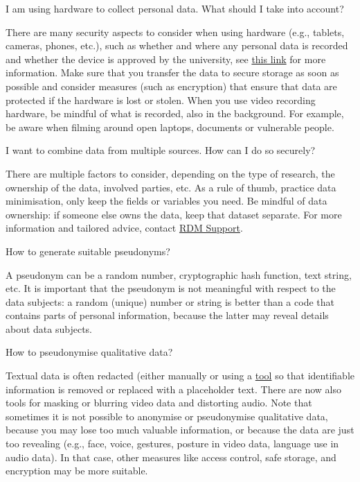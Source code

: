 \documentclass[
]{book}
\begin{document}
I am using hardware to collect personal data. What should I take into account?

There are many security aspects to consider when using hardware (e.g., tablets, cameras, phones, etc.), such as whether and where any personal data is recorded and whether the device is approved by the university, see \href{https://students.uu.nl/en/practical-information/it-facilities/information-security-at-the-uu}{this link} for more information. Make sure that you transfer the data to secure storage as soon as possible and consider measures (such as encryption) that ensure that data are protected if the hardware is lost or stolen. When you use video recording hardware, be mindful of what is recorded, also in the background. For example, be aware when filming around open laptops, documents or vulnerable people.

I want to combine data from multiple sources. How can I do so securely?

There are multiple factors to consider, depending on the type of research, the ownership of the data, involved parties, etc. As a rule of thumb, practice data minimisation, only keep the fields or variables you need. Be mindful of data ownership: if someone else owns the data, keep that dataset separate. For more information and tailored advice, contact \href{https://www.uu.nl/en/research/research-data-management/contact-us}{RDM Support}.

How to generate suitable pseudonyms?

A pseudonym can be a random number, cryptographic hash function, text string, etc. It is important that the pseudonym is not meaningful with respect to the data subjects: a random (unique) number or string is better than a code that contains parts of personal information, because the latter may reveal details about data subjects.

How to pseudonymise qualitative data?

Textual data is often redacted (either manually or using a \href{https://github.com/UtrechtUniversity/privacy-engineering-tools/tree/main/deidentification}{tool} so that identifiable information is removed or replaced with a placeholder text. There are now also tools for masking or blurring video data and distorting audio. Note that sometimes it is not possible to anonymise or pseudonymise qualitative data, because you may lose too much valuable information, or because the data are just too revealing (e.g., face, voice, gestures, posture in video data, language use in audio data). In that case, other measures like access control, safe storage, and encryption may be more suitable.
\end{document}
